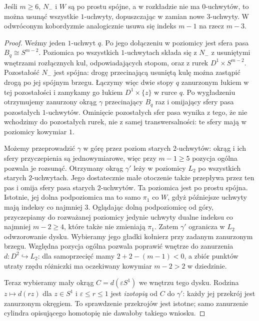 \begin{lemat}
\label{lem:handel-trade-hc-19}
Jeśli $m\geq6$, $N_-$ i $W$ są
po prostu spójne, a w rozkładzie
nie ma $0$-uchwytów, to można
usunąć wszystkie $1$-uchwyty,
dopuszczając w zamian nowe
$3$-uchwyty. W odwróconym
kobordyzmie analogicznie
usuwa się indeks $m-1$
na rzecz $m-3$.
\end{lemat}
\begin{proof}
Weźmy jeden $1$-uchwyt $q$.
Po jego dołączeniu w poziomicy
jest sfera pasa $B_q\cong S^{m-2}$.
Poziomica po wszystkich $1$-uchwytach składa się z $N_-$
z usuniętymi wnętrzami rozłącznych kul, odpowiadających stopom,
oraz z rurek $D^1\times S^{m-2}$.
Pozostałość $N_-$ jest spójna: drogę przecinającą usuniętą kulę
można zastąpić drogą po jej spójnym brzegu.
Łączymy więc dwie stopy $q$ zanurzonym łukiem w tej pozostałości
i zamykamy go łukiem $D^1\times\{z\}$ w rurce $q$.
Po wygładzeniu otrzymujemy zanurzony okrąg
$\gamma$ przecinający $B_q$
raz i omijający sfery pasa
pozostałych $1$-uchwytów.
Ominięcie pozostałych sfer pasa wynika z tego, że nie wchodzimy
do pozostałych rurek, nie z samej transwersalności: te sfery mają
w poziomicy kowymiar $1$.

Możemy przeprowadzić $\gamma$
w górę przez poziom starych
$2$-uchwytów: okrąg i ich
sfery przyczepienia są
jednowymiarowe, więc przy
$m-1\geq5$ pozycja ogólna
pozwala je rozsunąć.
Otrzymany okrąg $\gamma'$ leży w poziomicy $L_2$ po wszystkich
starych $2$-uchwytach. Jego dostatecznie małe otoczenie także
przepływa przez ten pas i omija sfery pasa starych $2$-uchwytów.
Ta poziomica jest po prostu
spójna. Istotnie, jej dolna
podpoziomica ma to samo $\pi_1$
co $W$, gdyż późniejsze uchwyty
mają indeksy co najmniej $3$.
Oglądając dolną podpoziomicę
od góry, przyczepiamy do
rozważanej poziomicy jedynie
uchwyty dualne indeksu
co najmniej $m-2\geq4$,
które także nie zmieniają
$\pi_1$. Zatem $\gamma'$ ogranicza w $L_2$ odwzorowanie dysku.
Wybieramy jego gładki kołnierz przy zadanym zanurzonym brzegu.
Względna pozycja ogólna pozwala poprawić wnętrze do zanurzenia
$d:D^2\hookrightarrow L_2$: dla samoprzecięć mamy
$2+2-(m-1)<0$, a zbiór punktów utraty rzędu różniczki ma
oczekiwany kowymiar $m-2>2$ w dziedzinie.

Teraz wybieramy mały okrąg $C=d(\varepsilon S^1)$ we wnętrzu
tego dysku. Rodzina $z\mapsto d(rz)$ dla $z\in S^1$ i
$\varepsilon\leq r\leq1$ jest \emph{izotopią} od $C$ do
$\gamma'$: każdy jej przekrój jest zanurzonym okręgiem.
To sprawdzenie przekrojów jest istotne; samo zanurzenie cylindra
opisującego homotopię nie dawałoby takiego wniosku.


\end{proof}
